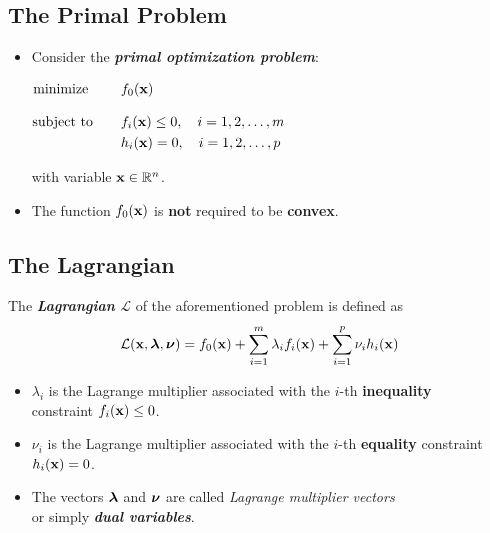 \subsection{The Primal Problem}

  \begin{itemize}
    \item Consider the \textbf{\emph{primal optimization problem}}: 
      \begin{center}
            $\begin{aligned}
               \displaystyle 
               \mbox{minimize~}  & \qquad f_0(\bm{\mathrm{x}}) \\[.3cm]
               \mbox{subject to} & \qquad f_i(\bm{\mathrm{x}}) \leq 0, \quad i=1,2,\dots, m \\
                                 & \qquad h_i(\bm{\mathrm{x}}) = 0,    \quad i=1,2,\dots, p
             \end{aligned}$
      \end{center}
      with variable $\bm{\mathrm{x}}\in\mathbb{R}^n$. 
    \item The function $f_0(\bm{\mathrm{x}})$ is \textbf{not} required to be \textbf{convex}.
  \end{itemize}

\subsection{The Lagrangian}

    The \textbf{\emph{Lagrangian} $\mathcal L$} of the aforementioned problem is defined as
    \begin{displaymath}
      \mathcal L(\bm{\mathrm{x}},\bm{\mathrm{\lambda}}, \bm{\mathrm{\nu}}) = 
      f_0(\bm{\mathrm{x}}) + \sum_{i=1}^m \lambda_i f_i(\bm{\mathrm{x}}) + \sum_{i=1}^p \nu_i h_i(\bm{\mathrm{x}})
    \end{displaymath}
    \begin{itemize}
      \item $\lambda_i$ is the Lagrange multiplier associated with the $i$-th \textbf{inequality} \\
        constraint $f_i(\bm{\mathrm{x}})\leq 0$. \\[.15cm]  
      \item $\nu_i$ is the Lagrange multiplier associated with the $i$-th \textbf{equality} constraint $h_i(\bm{\mathrm{x}})= 0$. \\[.15cm]  
      \item The vectors $\bm{\mathrm{\lambda}}$ and $\bm{\mathrm{\nu}}$ are called {\em Lagrange multiplier vectors} \\
        or simply \textbf{\emph{dual variables}}. 
    \end{itemize}
  
